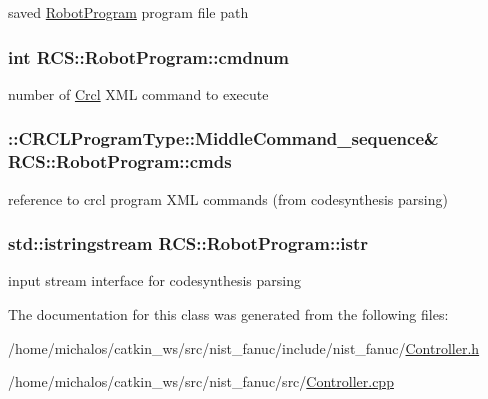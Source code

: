 saved \hyperlink{classRCS_1_1RobotProgram}{Robot\-Program} program file path \hypertarget{classRCS_1_1RobotProgram_ad43243236b573d0e3fc39d4890a43373}{
\subsubsection[{cmdnum}]{\setlength{\rightskip}{0pt plus 5cm}int R\-C\-S\-::\-Robot\-Program\-::cmdnum}}\label{classRCS_1_1RobotProgram_ad43243236b573d0e3fc39d4890a43373}
number of \hyperlink{namespaceCrcl}{Crcl} X\-M\-L command to execute \hypertarget{classRCS_1_1RobotProgram_ad6ed8ea72249e836521b2f7d7feb3523}{
\subsubsection[{cmds}]{\setlength{\rightskip}{0pt plus 5cm}\-::C\-R\-C\-L\-Program\-Type\-::\-Middle\-Command\-\_\-sequence\& R\-C\-S\-::\-Robot\-Program\-::cmds}}\label{classRCS_1_1RobotProgram_ad6ed8ea72249e836521b2f7d7feb3523}
reference to crcl program X\-M\-L commands (from codesynthesis parsing) \hypertarget{classRCS_1_1RobotProgram_a0099964c452870619bd0ee7651ffb072}{
\subsubsection[{istr}]{\setlength{\rightskip}{0pt plus 5cm}std\-::istringstream R\-C\-S\-::\-Robot\-Program\-::istr}}\label{classRCS_1_1RobotProgram_a0099964c452870619bd0ee7651ffb072}
input stream interface for codesynthesis parsing 

The documentation for this class was generated from the following files\-:\begin{DoxyCompactItemize}
\item 
/home/michalos/catkin\-\_\-ws/src/nist\-\_\-fanuc/include/nist\-\_\-fanuc/\hyperlink{Controller_8h}{Controller.\-h}\item 
/home/michalos/catkin\-\_\-ws/src/nist\-\_\-fanuc/src/\hyperlink{Controller_8cpp}{Controller.\-cpp}\end{DoxyCompactItemize}
